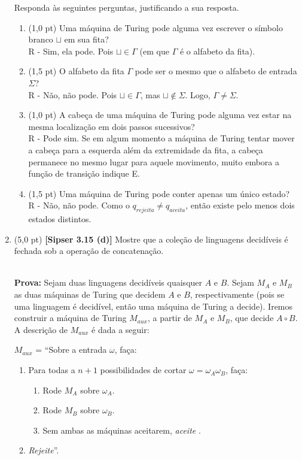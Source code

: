 \documentclass[12pt,a4paper,oneside]{article}
\begin{document}
\begin{enumerate}
	Responda às seguintes perguntas, justificando a sua resposta.
	\begin{enumerate}
		\item (1,0 pt) Uma máquina de Turing pode alguma vez escrever o símbolo branco $\sqcup$ em sua fita? \\
		{\color{blue}
			R - Sim, ela pode. Pois $\sqcup \in \Gamma$ (em que $\Gamma$ é o alfabeto da fita).
		}
		\item (1,5 pt) O alfabeto da fita $\Gamma$ pode ser o mesmo que o alfabeto de entrada $\Sigma$? \\
		{\color{blue}
			R - Não, não pode. Pois $\sqcup \in \Gamma$, mas $\sqcup \not\in \Sigma$. Logo, $\Gamma \not= \Sigma$.
		}
		\item (1,0 pt) A cabeça de uma máquina de Turing pode alguma vez estar na mesma localização em dois passos sucessivos?\\
		{\color{blue}
			R - Pode sim. Se em algum momento a máquina de Turing tentar mover a cabeça para a esquerda além da extremidade da fita, a cabeça permanece no mesmo lugar para aquele movimento, muito embora a função de transição indique E. 
		}
		\item (1,5 pt) Uma máquina de Turing pode conter apenas um único estado?\\
		{\color{blue}
			R - Não, não pode. Como o $q_{rejeita} \not= q_{aceita}$, então existe pelo menos dois estados distintos.
		}
	\end{enumerate}

	\newpage

	\item (5,0 pt) {\bf [Sipser 3.15 (d)]} Mostre que a coleção de linguagens decidíveis é fechada sob a operação de concatenação.\\
	\\{\color{blue}	
		{\bf Prova:} Sejam duas linguagens decidíveis quaisquer $A$ e $B$. Sejam $M_A$ e $M_B$ as duas máquinas de Turing que decidem $A$ e $B$, respectivamente (pois se uma linguagem é decidível, então uma máquina de Turing a decide). Iremos construir a máquina de Turing $M_{aux}$, a partir de $M_A$ e $M_B$, que decide $A \circ B$. A descrição de $M_{aux}$ é dada a seguir:
		
		$M_{aux}$ = ``Sobre a entrada $\omega$, faça:
		\begin{enumerate}
			\item Para todas a $n+1$ possibilidades de cortar $\omega=\omega_A \omega_B$, faça:
			\begin{enumerate}
				\item Rode $M_A$ sobre $\omega_A$. 
				\item Rode $M_B$ sobre $\omega_B$.
				\item Sem ambas as máquinas aceitarem, {\it aceite} .
			\end{enumerate}
			\item {\it Rejeite}''.
		\end{enumerate}
		
}
\end{enumerate}
\end{document}
